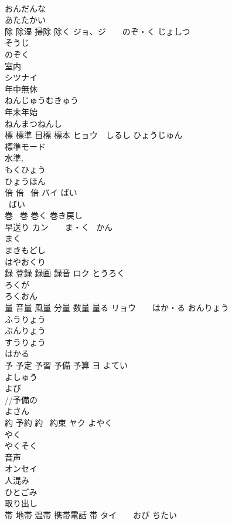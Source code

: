 \documentclass[8pt]{extreport}
\begin{document}
\begin{CJK}{UTF8}{min}
\\	おんだんな 
\\	あたたかい 
\\	除 除湿 掃除 除く	ジョ、ジ　　のぞ・く じょしつ 
\\	そうじ 
\\	のぞく 
\\	室内	
\\	シツナイ
\\	年中無休	
\\	ねんじゅうむきゅう
\\	年末年始	
\\	ねんまつねんし
\\	標 標準 目標 標本	ヒョウ　しるし ひょうじゅん 
\\	標準モード 
\\	水準, 
\\	もくひょう 
\\	ひょうほん 
\\	倍 倍 ~倍	バイ ばい 
\\	~ばい 
\\	巻 ~巻 巻く 巻き戻し　
\\	早送り	カン　　ま・く ~かん 
\\	まく 
\\	まきもどし 
\\	はやおくり 
\\	録 登録 録画 録音	ロク とうろく 
\\	ろくが 
\\	ろくおん 
\\	量 音量 風量 分量 数量 量る	リョウ　　はか・る おんりょう 
\\	ふうりょう 
\\	ぶんりょう 
\\	すうりょう 
\\	はかる 
\\	予 予定 予習 予備 予算	ヨ よてい　
\\	よしゅう 
\\	よび 
\\	//予備の 
\\	よさん 
\\	約 予約 約~ 約束	ヤク よやく 
\\	やく~ 
\\	やくそく 
\\	音声	
\\	オンセイ
\\	人混み	
\\	ひとごみ
\\	取り出し	
\\	帯 地帯 温帯 携帯電話 帯	タイ　　おび ちたい　

\end{CJK}
\end{document}
